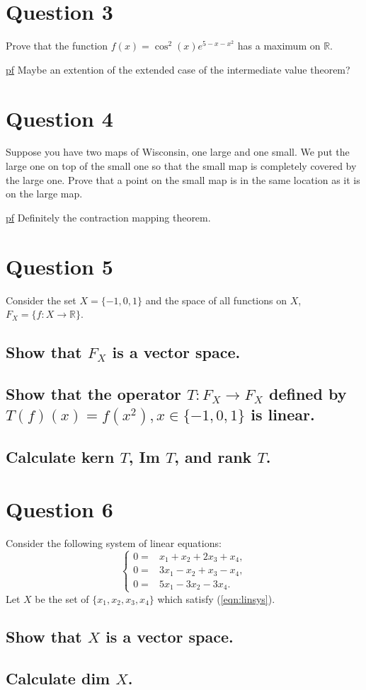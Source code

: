 \documentclass[11pt]{article} %
\begin{document}
\section{Question 3}
Prove that the function $f(x) = \cos^2 (x)e^{5-x-x^2}$ has a maximum on $\mathbb{R}$.

\underline{pf} Maybe an extention of the extended case of the intermediate value theorem?


\section{Question 4}
Suppose you have two maps of Wisconsin, one large and one small. We put the large one on top of the small one so that the small map is completely covered by the large one. Prove that a point on the small map is in the same location as it is on the large map.

\underline{pf} Definitely the contraction mapping theorem.


\section{Question 5}
Consider the set $X = \{ -1, 0, 1 \}$ and the space of all functions on $X$, $F_X = \{ f: X \rightarrow \mathbb{R} \}$.

\subsection{Show that $F_X$ is a vector space.}
\subsection{Show that the operator $T: F_X \rightarrow F_X$ defined by $T(f)(x) = f(x^2), x \in \{ -1,0,1\}$ is linear.}
\subsection{Calculate kern $T$, Im $T$, and rank $T$.}
\section{Question 6}
Consider the following system of linear equations:
\begin{equation}
\begin{cases}
0=& x_1 + x_2 + 2x_3 + x_4, \\
0=&3x_1 - x_2 + x_3 - x_4, \\
0=&5x_1 - 3x_2 - 3x_4. \label{eqn:linsys}
\end{cases}
\end{equation}
Let $X$ be the set of $\{ x_1,x_2,x_3,x_4 \}$ which satisfy (\ref{eqn:linsys}).
\subsection{Show that $X$ is a vector space.}
\subsection{Calculate dim $X$.}
\end{document}
